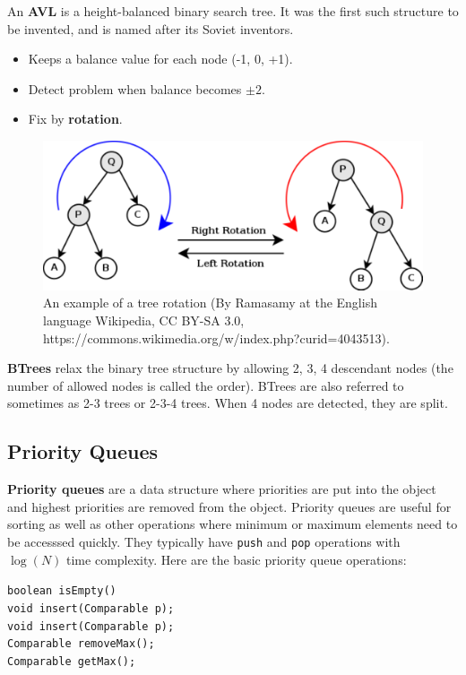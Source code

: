 An \textbf{AVL} is a height-balanced binary search tree. It was the first such structure to be invented, and is named after its Soviet inventors. 
\begin{itemize}
	\item Keeps a balance value for each node (-1, 0, +1).
	\item Detect problem when balance becomes $\pm 2$. 
	\item Fix by \textbf{rotation}. 
\end{itemize}

\begin{figure}[tb]
\centering
\includegraphics[width=0.75\columnwidth]{Figures/Tree_rotation.pdf}
\caption{An example of a tree rotation (By Ramasamy at the English language Wikipedia, CC BY-SA 3.0, https://commons.wikimedia.org/w/index.php?curid=4043513).}
\label{fig:rotation}
\end{figure}

\textbf{BTrees} relax the binary tree structure by allowing 2, 3, 4 descendant nodes (the number of allowed nodes is called the order). BTrees are also referred to sometimes as 2-3 trees or 2-3-4 trees. When 4 nodes are detected, they are split. 

\subsection{Priority Queues}

\textbf{Priority queues} are a data structure where priorities are put into the object and highest priorities are removed from the object. Priority queues are useful for sorting as well as other operations where minimum or maximum elements need to be accesssed quickly. They typically have \texttt{push} and \texttt{pop} operations with $\log(N)$ time complexity. Here are the basic priority queue operations:

\indent \indent \texttt{boolean isEmpty()} \\
\indent \indent \texttt{void insert(Comparable p);} \\
\indent \indent \texttt{void insert(Comparable p);} \\
\indent \indent \texttt{Comparable removeMax();} \\
\indent \indent \texttt{Comparable getMax();} \\

